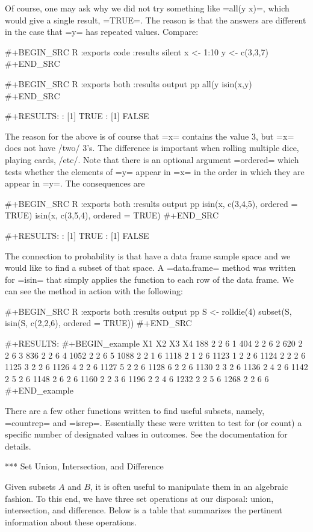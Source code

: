 Of course, one may ask why we did not try something like =all(y %
x)=, which would give a single result, =TRUE=. The reason is that the
answers are different in the case that =y= has repeated
values. Compare:

#+BEGIN_SRC R :exports code :results silent
x <- 1:10 
y <- c(3,3,7) 
#+END_SRC 

#+BEGIN_SRC R :exports both :results output pp   
all(y %
isin(x,y) 
#+END_SRC 

#+RESULTS:
: [1] TRUE
: [1] FALSE

The reason for the above is of course that =x= contains the value 3,
but =x= does not have /two/ 3's. The difference is important when
rolling multiple dice, playing cards, /etc/. Note that there is an
optional argument =ordered= which tests whether the elements of =y=
appear in =x= in the order in which they are appear in =y=. The
consequences are

#+BEGIN_SRC R :exports both :results output pp   
isin(x, c(3,4,5), ordered = TRUE) 
isin(x, c(3,5,4), ordered = TRUE) 
#+END_SRC 

#+RESULTS:
: [1] TRUE
: [1] FALSE

The connection to probability is that have a data frame sample space
and we would like to find a subset of that space. A =data.frame=
method was written for =isin= that simply applies the function to each
row of the data frame. We can see the method in action with the
following:

#+BEGIN_SRC R :exports both :results output pp  
S <- rolldie(4) 
subset(S, isin(S, c(2,2,6), ordered = TRUE)) 
#+END_SRC

#+RESULTS:
#+BEGIN_example
     X1 X2 X3 X4
188   2  2  6  1
404   2  2  6  2
620   2  2  6  3
836   2  2  6  4
1052  2  2  6  5
1088  2  2  1  6
1118  2  1  2  6
1123  1  2  2  6
1124  2  2  2  6
1125  3  2  2  6
1126  4  2  2  6
1127  5  2  2  6
1128  6  2  2  6
1130  2  3  2  6
1136  2  4  2  6
1142  2  5  2  6
1148  2  6  2  6
1160  2  2  3  6
1196  2  2  4  6
1232  2  2  5  6
1268  2  2  6  6
#+END_example

There are a few other functions written to find useful subsets,
namely, =countrep= and =isrep=. Essentially these were written to test
for (or count) a specific number of designated values in outcomes. See
the documentation for details.

*** Set Union, Intersection, and Difference

Given subsets \(A\) and \(B\), it is often useful to manipulate them
in an algebraic fashion. To this end, we have three set operations at
our disposal: union, intersection, and difference. Below is a table
that summarizes the pertinent information about these operations.

